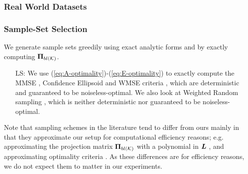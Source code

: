 \subsubsection{Real World Datasets}


\subsubsection{Sample-Set Selection}

We generate sample sets greedily using exact analytic forms and by exactly computing $\bm{\Pi}_{bl(\mathcal{K})}$.
\begin{itemize}
    \item[LS:] We use (\ref{eq:A-optimality})-(\ref{eq:E-optimality}) to exactly compute the MMSE {\color{black}\cite{wang2018optimal,wang2019low, mfn}}, Confidence Ellipsoid {\color{black}\cite{jayawant2021doptimal, tremblay2017determinantal,mfn}} and WMSE criteria {\color{black} \cite{bai2020fast}}, which are deterministic and guaranteed to be noiseless-optimal.  We also look at Weighted Random sampling \cite{puy2018random}, which is neither deterministic nor guaranteed to be noiseless-optimal.
\end{itemize}
Note that sampling schemes in the literature tend to differ from ours mainly in that they approximate our setup for computational efficiency reasons; e.g. approximating the projection matrix $\projbl$ with a polynomial in $\bm{L}$ \cite{wang2018optimal}, and approximating optimality criteria \cite{bai2020fast}. As these differences are for efficiency reasons, we do not expect them to matter in our experiments.

